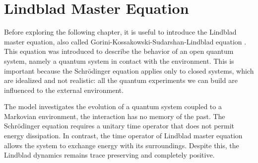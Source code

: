 \chapter{Lindblad Master Equation}\label{C_Lindblad}
Before exploring the following chapter, it is useful to introduce the Lindblad master equation, also called Gorini-Kossakowski-Sudarshan-Lindblad equation \cite{Lindblad,G_K_S}. This equation was introduced to describe the behavior of an open quantum system, namely a quantum system in contact with the environment. This is important because the Schrödinger equation applies only to closed systems, which are idealized and not realistic: all the quantum experiments we can build are influenced to the external environment.

The model investigates the evolution of a quantum system coupled to a Markovian environment, the interaction has no memory of the past.  
The Schrödinger equation requires a unitary time operator that does not permit energy dissipation. In contrast, the time operator of Lindblad master equation allows the system to exchange energy with its surroundings. 
Despite this, the Lindblad dynamics remains trace preserving and completely positive.

